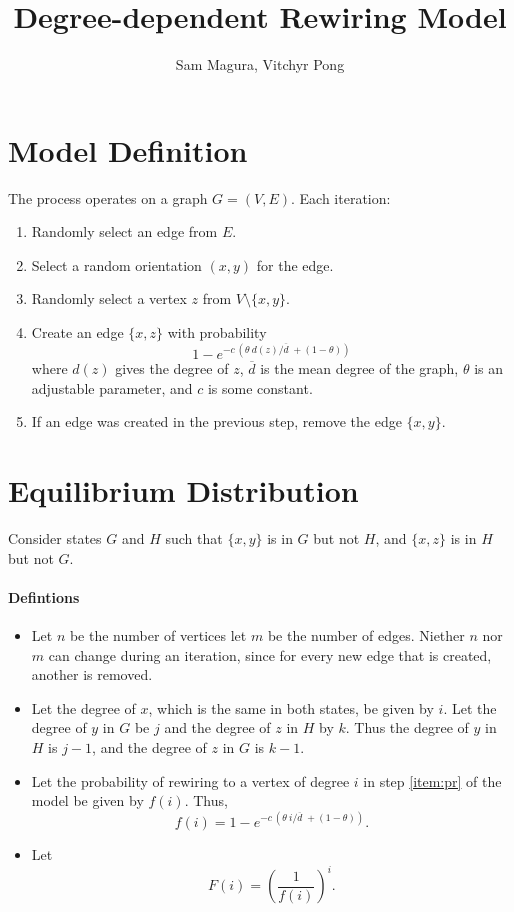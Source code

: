 \documentclass[a4paper,10pt]{article}
\title{Degree-dependent Rewiring Model}
\author{Sam Magura, Vitchyr Pong}
\begin{document}
\maketitle

\section{Model Definition}

The process operates on a graph $G = (V, E)$. Each iteration:

\begin{enumerate}
 \item Randomly select an edge from $E$. 
 \item Select a random orientation $(x, y)$ for the edge.
 \item \label{item:z} Randomly select a vertex $z$ from $V \setminus \{x, y\}$.
 \item \label{item:pr} Create an edge $\{x, z\}$ with probability
\begin{equation}
 1 - e^{-c\,(\theta \: d(z) / \overline{d}\; + (1 - \theta))}
\end{equation}
where $d(z)$ gives the degree of $z$, $\overline{d}$ is the mean degree of the graph, $\theta$ is an adjustable parameter, and $c$ is some constant.
 \item If an edge was created in the previous step, remove the edge $\{x, y\}$.
\end{enumerate}

\section{Equilibrium Distribution}
Consider states $G$ and $H$ such that $\{x, y\}$ is in $G$ but not $H$, and $\{x, z\}$ is in $H$ but not $G$. 

\paragraph{Defintions} 
\begin{itemize}
 \item Let $n$ be the number of vertices let $m$ be the number of edges. Niether $n$ nor $m$ can change during an iteration, since for every new edge that is created, another is removed.
 \item  Let the degree of $x$, which is the same in both states, be given by $i$. Let the degree of $y$ in $G$ be $j$ and the degree of $z$ in $H$ by $k$. Thus the degree of $y$ in $H$ is $j - 1$, and the degree of $z$ in $G$ is $k - 1$.
 \item Let the probability of rewiring to a vertex of degree $i$ in step \ref{item:pr} of the model be given by $f(i)$. Thus,
\begin{equation}
 f(i) = 1 - e^{-c\,(\theta \: i / \overline{d}\; + (1 - \theta))}.
\end{equation}
 \item Let
 \begin{equation}
  F(i) = \left(\frac{1}{f(i)}\right)^i.
 \end{equation}

\end{itemize}
\end{document}

